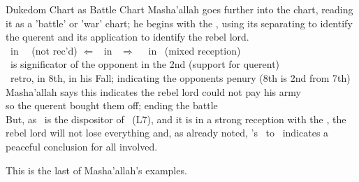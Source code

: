 \begin{frame}[t]{Dukedom Chart as Battle Chart}
Masha'allah goes further into the chart, reading it as a 'battle' or 'war' chart; he begins with the \Moon, using its separating to identify the querent and its application to identify the rebel lord. \\
\vspace{0.25cm}
\Jupiter\ in \Virgo\ \Trine\ (not rec'd) $\Leftarrow$ \Moon\ in \Capricorn\ $\Rightarrow$ \Opposition\ \Mars\ in \Cancer\ (mixed reception) \\
\hspace{1em}\Moon\ is significator of the opponent  in the 2nd (support for querent) \\
\hspace{1em}\Mars\ retro, in 8th, in his Fall; indicating the opponents penury (8th is 2nd from 7th) \\
\hspace{1em} Masha'allah says this indicates the rebel lord could not pay his army \\
\hspace{1em} so the querent bought them off; ending the battle \\
\vspace{0.25cm}
But, as \Mars\ is the dispositor of \Mercury\ (L7), and it is in a strong reception with the \Moon, the rebel lord will not lose everything and, as already noted, \Mercury's \Sextile\ to \Jupiter\ indicates a peaceful conclusion for all involved.

This is the last of Masha'allah's examples.

\end{frame}